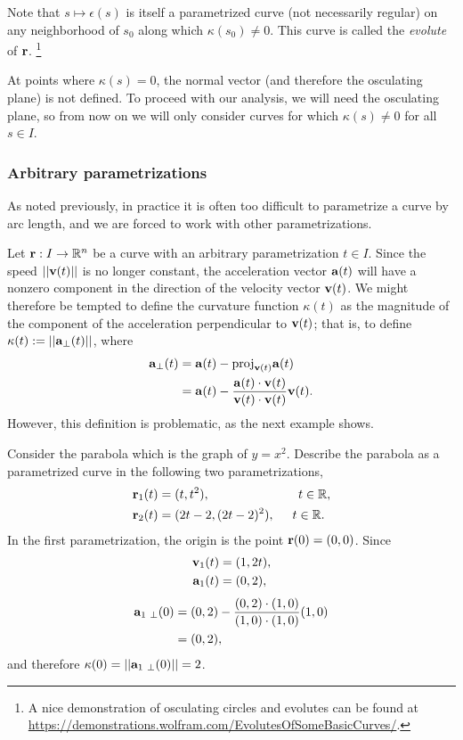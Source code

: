 \documentclass[12pt,letterpaper,reqno]{article}
\numberwithin{equation}{section}
\newcommand{\R}{\ensuremath{\mathbb R}}
\newcommand{\bv}{{\bf v}}
\newcommand{\ba}{{\bf a}}
\newcommand{\bbr}{{\bf r}}
\begin{document}
{Note that $s \mapsto \epsilon(s)$ is itself a parametrized curve (not necessarily regular) on any neighborhood of $s_0$ along which $\kappa(s_0) \neq 0$. This curve is called the \emph{evolute} of $\bbr$. \footnote{A nice demonstration of osculating circles and  evolutes can be found at \href{https://demonstrations.wolfram.com/EvolutesOfSomeBasicCurves/}{https://demonstrations.wolfram.com/EvolutesOfSomeBasicCurves/}.}

At points where $\kappa(s)=0$, the normal vector (and therefore the osculating plane) is not defined. To proceed with our analysis, we will need the osculating plane, so from now on we will only consider curves for which $\kappa(s) \neq 0$ for all $s \in I$.

\subsubsection{Arbitrary parametrizations}
As noted previously, in practice it is often too difficult to parametrize a curve by arc length, and we are forced to work with other parametrizations.

Let $\bbr:I \to \R^n$ be a curve with an arbitrary parametrization $t \in I$. Since the speed $||\bv(t)||$ is no longer constant, the acceleration vector $\ba(t)$ will have a nonzero component in the direction of the velocity vector $\bv(t)$. We might therefore be tempted to define the curvature function $\kappa(t)$ as the magnitude of the component of the acceleration perpendicular to $\bv(t)$; that is, to define $\kappa(t):=||\ba_\perp(t)||$, where
\begin{align*}
	\ba_\perp(t)&=\ba(t)-\text{proj}_{\bv(t)}\ba(t) \\
	&=\ba(t)-\frac{\ba(t)\cdot \bv(t)}{\bv(t)\cdot \bv(t)}\bv(t). 
\end{align*}
 However, this definition is problematic, as the next example shows.

\begin{example}\label{ex:curvature_arb_bad_def}
Consider the parabola which is the graph of $y=x^2$. Describe the parabola as a parametrized curve in the following two  parametrizations,	
\begin{align*}
	\bbr_1(t)&=(t,t^2), \hspace{2.5cm} t \in \R, \\
	\bbr_2(t)&=(2t-2,(2t-2)^2), \hspace{0.5cm} t \in \R.
\end{align*}
In the first parametrization, the origin is the point $\bbr(0)=(0,0)$. Since
\begin{align*}
	\bv_1(t)&=(1,2t), \\
	\ba_1(t)&=(0,2),
\end{align*}
\begin{align*}
	\ba_{1 \ \perp}(0)&=(0,2)-\frac{(0,2)\cdot (1,0)}{(1,0)\cdot (1,0)}(1,0) \\
	&=(0,2),
\end{align*}
and therefore $\kappa(0)=||\ba_{1 \ \perp}(0)||=2$.


\end{example}}
\end{document}
